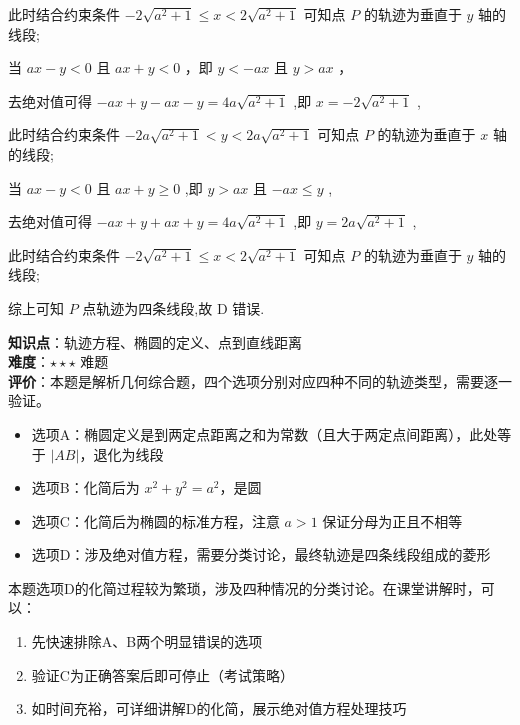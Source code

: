 \documentclass[10pt]{article}
\newcommand*\circled[1]{\tikz[baseline=(char.base)]{\node[shape=circle,draw,inner sep=1.5pt] (char) {\small #1};}}
\begin{document}
此时结合约束条件 \(- 2\sqrt{{a}^{2} + 1} \leq  x < 2\sqrt{{a}^{2} + 1}\) 可知点 \(P\) 的轨迹为垂直于 \(y\) 轴的线段;

\circled{3}  当 \({ax} - y < 0\) 且 \({ax} + y < 0\) ，即 \(y <  - {ax}\) 且 \(y > {ax}\) ，

去绝对值可得 \(- {ax} + y - {ax} - y = {4a}\sqrt{{a}^{2} + 1}\) ,即 \(x =  - 2\sqrt{{a}^{2} + 1}\) ,

此时结合约束条件 \(- {2a}\sqrt{{a}^{2} + 1} < y < {2a}\sqrt{{a}^{2} + 1}\) 可知点 \(P\) 的轨迹为垂直于 \(x\) 轴的线段;

\circled{4}  当 \({ax} - y < 0\) 且 \({ax} + y \geq  0\) ,即 \(y > {ax}\) 且 \(- {ax} \leq  y\) ,

去绝对值可得 \(- {ax} + y + {ax} + y = {4a}\sqrt{{a}^{2} + 1}\) ,即 \(y = {2a}\sqrt{{a}^{2} + 1}\) ,

此时结合约束条件 \(- 2\sqrt{{a}^{2} + 1} \leq  x < 2\sqrt{{a}^{2} + 1}\) 可知点 \(P\) 的轨迹为垂直于 \(y\) 轴的线段;

综上可知 \(P\) 点轨迹为四条线段,故 \(\mathrm{D}\) 错误.

\begin{analysisbox}[考点分析]
\textbf{知识点}：轨迹方程、椭圆的定义、点到直线距离\\
\textbf{难度}：\(\star\star\star\) 难题\\
\textbf{评价}：本题是解析几何综合题，四个选项分别对应四种不同的轨迹类型，需要逐一验证。
\begin{itemize}
\item 选项A：椭圆定义是到两定点距离之和为常数（且大于两定点间距离），此处等于 \(|AB|\)，退化为线段
\item 选项B：化简后为 \(x^2 + y^2 = a^2\)，是圆
\item 选项C：化简后为椭圆的标准方程，注意 \(a > 1\) 保证分母为正且不相等
\item 选项D：涉及绝对值方程，需要分类讨论，最终轨迹是四条线段组成的菱形
\end{itemize}
\end{analysisbox}

\begin{tipbox}[教学提示]
本题选项D的化简过程较为繁琐，涉及四种情况的分类讨论。在课堂讲解时，可以：
\begin{enumerate}
\item 先快速排除A、B两个明显错误的选项
\item 验证C为正确答案后即可停止（考试策略）
\item 如时间充裕，可详细讲解D的化简，展示绝对值方程处理技巧
\end{enumerate}
\end{tipbox}
\end{document}
